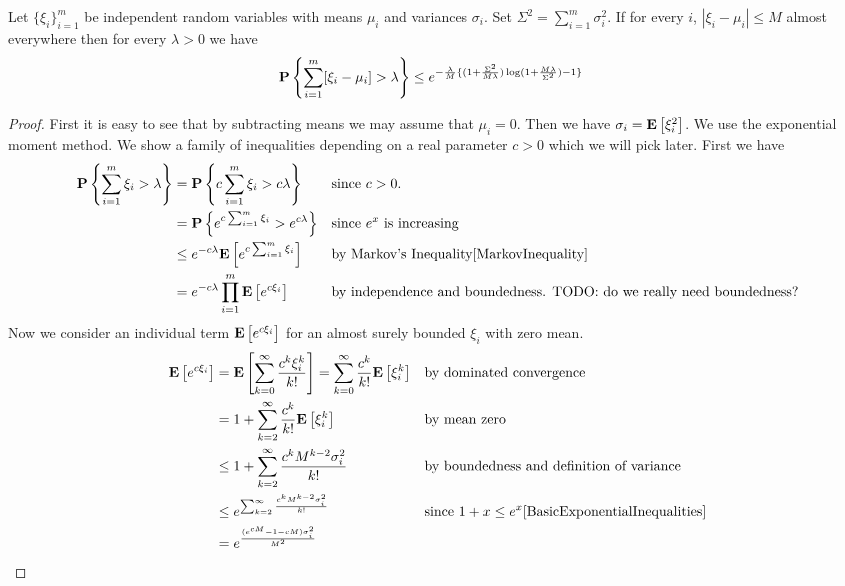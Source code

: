 \begin{lem}\label{Bennett} Let
  $\{\xi_i\}_{i=1}^m$ be independent random variables with 
means $\mu_i$ and variances $\sigma_i$.  Set $\Sigma^2 = \sum_{i=1}^m \sigma_i^2$.  
If for every $i$, $|\xi_i - \mu_i| \leq M$ almost everywhere then for every $\lambda > 0$ we have 
\begin{align*}
\textbf{P}\left \{\sum_{i=1}^m [\xi_i - \mu_i] > \lambda \right \} 
&\leq 
e^{
	-\frac{\lambda}{M}\{(1 + \frac{\Sigma^2}{M\lambda})\log(1+\frac{M\lambda}{\Sigma^2}) - 1\}
}
\end{align*}
\end{lem}
\begin{proof}
First it is easy to see that by subtracting means we may assume that
$\mu_i=0$.  Then we have $\sigma_i = \textbf{E}\left[\xi_i^2\right]$.  We use
the exponential moment method.  We show a family of inequalities
depending on a real parameter $c > 0$ which we will pick later.  First we have 
\begin{align*}
\textbf{P}\left \{\sum_{i=1}^m \xi_i > \lambda \right \} & =
\textbf{P}\left \{c\sum_{i=1}^m \xi_i > c\lambda \right \}  && \textrm{since } c >0.\\
  & =\textbf{P}\left \{e^{c\sum_{i=1}^m \xi_i} > e^{c\lambda} \right \} &&
  \textrm{since } e^x \textrm{ is increasing}\\
  & \leq e^{-c\lambda} \textbf{E}\left[e^{c\sum_{i=1}^m \xi_i}\right] && \textrm
  {by Markov's Inequality}\eqref{MarkovInequality}\\
  & = e^{-c\lambda} \prod_{i=1}^m \textbf{E}\left[e^{c\xi_i}\right] &&
  \textrm{by independence and boundedness.  TODO: do we really need boundedness?}
\end{align*}
Now we consider an individual term $\textbf{E}\left[e^{c\xi_i}\right]$ for an
almost surely bounded $\xi_i$ with zero mean.
\begin{align*}
\expectation{e^{c\xi_i}} &= \expectation{\sum_{k=0}^\infty
  \frac{c^k\xi_i^k}{k!}} = \sum_{k=0}^\infty
  \frac{c^k}{k!}\expectation{\xi_i^k} && \textrm{by dominated
    convergence} \\
& = 1  + \sum_{k=2}^\infty
  \frac{c^k}{k!}\expectation{\xi_i^k} && \textrm{by mean zero} \\
& \leq 1  + \sum_{k=2}^\infty
  \frac{c^k M^{k-2} \sigma_i^2}{k!} && \textrm{by boundedness and
    definition of variance} \\
& \leq e^{\sum_{k=2}^\infty  \frac{c^k M^{k-2} \sigma_i^2}{k!}} &&
\textrm{since } 1+x \leq e^x \eqref{BasicExponentialInequalities} \\
& = e^{\frac{(e^{cM} -1 - cM)\sigma_i^2}{M^2}}

\end{align*}
\end{proof}
